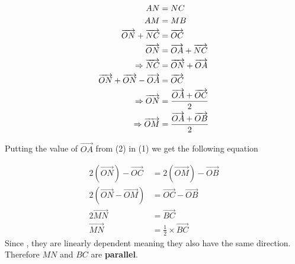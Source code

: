 \documentclass[11pt]{article}
\begin{document}
\begin{align}
AN & =NC \notag \\
AM & = MB \notag \\
    \overrightarrow{ON} + \overrightarrow{NC} & = \overrightarrow{OC} \notag \\
    \overrightarrow{ON} & = \overrightarrow{OA} + \overrightarrow{NC}\notag \\
    \Rightarrow \overrightarrow{NC} & = \overrightarrow{ON} + \overrightarrow{OA}\notag\\
    \overrightarrow{ON} + \overrightarrow{ON} - \overrightarrow{OA} & = \overrightarrow{OC}\notag\\
    \Rightarrow \overrightarrow{ON} & = \frac{\overrightarrow{OA} + \overrightarrow{OC}}{2}\\
    \Rightarrow \overrightarrow{OM} & = \frac{\overrightarrow{OA} + \overrightarrow{OB}}{2}
\end{align}
\begin{center}
    Putting the value of $\overrightarrow{OA}$ from (2) in (1) we get the following equation
\end{center}
\begin{align*}
    2(\overrightarrow{ON}) - \overrightarrow{OC} & = 2(\overrightarrow{OM}) - \overrightarrow{OB}\\
    2(\overrightarrow{ON} - \overrightarrow{OM}) & = \overrightarrow{OC} - \overrightarrow{OB}\\
    2\overrightarrow{MN} & = \overrightarrow{BC}\\
    \overrightarrow{MN} & = \frac{1}{2}\times \overrightarrow{BC}
\end{align*}
Since \textbf{}, they are linearly dependent meaning they also have the same direction. Therefore $MN$ and $BC$ are \textbf{parallel}. 
\end{document}
